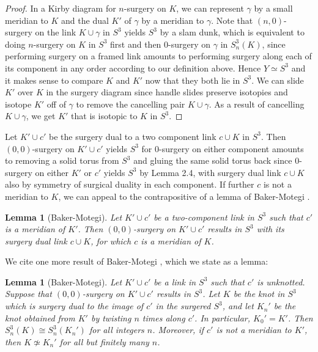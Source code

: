 \documentclass[11pt,usenames,dvipsnames,reqno]{amsart}
\numberwithin{theorem}{section}
\newtheorem{lemma}[theorem]{Lemma}
\theoremstyle{ex}
\theoremstyle{rem}
\begin{document}
\begin{proof}
	In a Kirby diagram for $n$-surgery on $K$, we can represent $\gamma$ by a small meridian to $K$ and the dual $K'$ of $\gamma$ by a meridian to $\gamma$. Note that $(n, 0)$-surgery on the link $K \cup \gamma$ in $S^3$ yields $S^3$ by a slam dunk, which is equivalent to doing $n$-surgery on $K$ in $S^3$ first and then $0$-surgery on $\gamma$ in $S^3_n(K)$, since performing surgery on a framed link amounts to performing surgery along each of its component in any order according to our definition above. Hence $Y \simeq S^3$ and it makes sense to compare $K$ and $K'$ now that they both lie in $S^3$. We can slide $K'$ over $K$ in the surgery diagram since handle slides preserve isotopies and isotope $K'$ off of $\gamma$ to remove the cancelling pair $K\cup \gamma$. As a result of cancelling $K\cup \gamma$, we get $K'$ that is isotopic to $K$ in $S^3$. 
\end{proof}

Let $K'\cup c'$ be the surgery dual to a two component link $c \cup K$ in $S^3$. Then $(0, 0)$-surgery on $K' \cup c'$ yields $S^3$ for $0$-surgery on either component amounts to removing a solid torus from $S^3$ and gluing the same solid torus back since $0$-surgery on either $K'$ or $c'$ yields $S^3$ by Lemma 2.4, with surgery dual link $c \cup K$ also by symmetry of surgical duality in each component. If further $c$ is not a meridian to $K$, we can appeal to the contrapositive of a lemma of Baker-Motegi \cite[Lemma 2.4]{baker-motegi}. 

\begin{lemma}[Baker-Motegi]
	Let $K'\cup c'$ be a two-component link in $S^3$ such that $c'$ is a meridian of $K'$. Then $(0,0)$-surgery on $K'\cup c'$ results in $S^3$ with its surgery dual link $c\cup K$, for which $c$ is a meridian of $K$.
\end{lemma}
	
We cite one more result of Baker-Motegi \cite[Theorem 2.1]{baker-motegi}, which we state as a lemma:

\begin{lemma}[Baker-Motegi]
	Let $K'\cup c'$ be a link in $S^3$ such that $c'$ is unknotted. Suppose that $(0,0)$-surgery on $K'\cup c'$ results in $S^3$. Let $K$ be the knot in $S^3$ which is surgery dual to the image of $c'$ in the surgered $S^3$, and let $K_n'$ be the knot obtained from $K'$ by twisting $n$ times along $c'$. In particular, $K_0'=K'$. Then $S^3_n(K)\cong S^3_n(K_n')$ for all integers $n$. Moreover, if $c'$ is not a meridian to $K'$, then $K\not\simeq K_n'$ for all but finitely many $n$.
\end{lemma}
\end{document}
